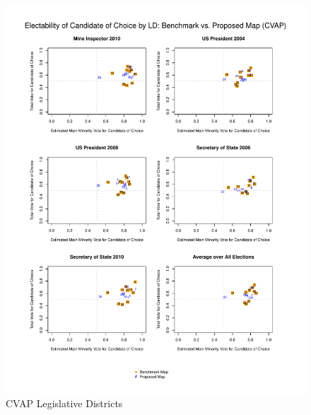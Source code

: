 \documentclass[12pt]{article}
\begin{document}
\begin{figure}[p!h]
\begin{center}
\includegraphics[scale=.8]{figs/cvap_ld.pdf}
\caption{\label{cvap_ld}CVAP Legislative Districts}
\end{center}
\end{figure}

\end{document}
